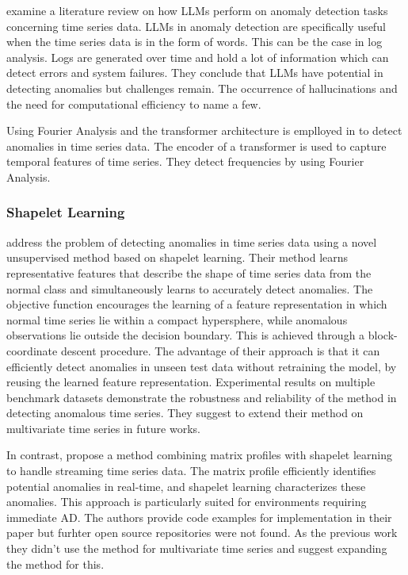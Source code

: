 \cite{su_large_2024} examine a literature review on how LLMs perform on anomaly detection tasks concerning time series data. LLMs in anomaly detection are specifically useful when the time series data is in the form of words. This can be the case in log analysis. Logs are generated over time and hold a lot of information which can detect errors and system failures. They conclude that LLMs have potential in detecting anomalies but challenges remain. The occurrence of hallucinations and the need for computational efficiency to name a few.

Using Fourier Analysis and the transformer architecture is emplloyed in  \cite{ye_multivariate_2023} to detect anomalies in time series data. The encoder of a transformer is used to capture temporal features of time series. They detect frequencies by using Fourier Analysis.

\subsubsection{Shapelet Learning}
\cite{beggel_time_2019} address the problem of detecting anomalies in time series data using a novel unsupervised method based on shapelet learning. Their method learns representative features that describe the shape of time series data from the normal class and simultaneously learns to accurately detect anomalies. The objective function encourages the learning of a feature representation in which normal time series lie within a compact hypersphere, while anomalous observations lie outside the decision boundary. This is achieved through a block-coordinate descent procedure.
The advantage of their approach is that it can efficiently detect anomalies in unseen test data without retraining the model, by reusing the learned feature representation. Experimental results on multiple benchmark datasets demonstrate the robustness and reliability of the method in detecting anomalous time series. They suggest to extend their method on multivariate time series in future works.

In contrast, \cite{alshaer_detecting_2020} propose a method combining matrix profiles with shapelet learning to handle streaming time series data. The matrix profile efficiently identifies potential anomalies in real-time, and shapelet learning characterizes these anomalies. This approach is particularly suited for environments requiring immediate AD. The authors provide code examples for implementation in their paper but furhter open source repositories were not found. As the previous work they didn't use the method for multivariate time series and suggest expanding the method for this.

